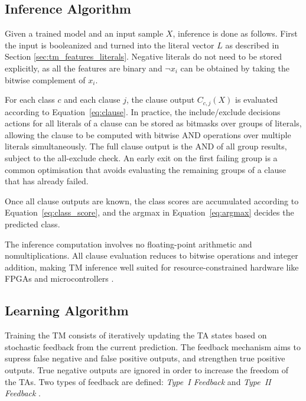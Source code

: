 \subsection{Inference Algorithm}
\label{sec:tm_inference}

Given a trained model and an input sample $X$, inference is done as follows.
First the input is booleanized and turned into the literal vector $L$ as
described in Section \ref{sec:tm_features_literals}. Negative literals do not need to be stored explicitly, as all the features are binary and $\lnot x_i$ can be obtained by taking the bitwise complement of $x_i$.

For each class $c$ and each clause $j$, the clause output $C_{c,j}(X)$ is
evaluated according to Equation~\eqref{eq:clause}. In practice, the
include/exclude decisions actions for all literals of a clause can be stored as bitmasks
over groups of literals, allowing the clause to be computed with bitwise AND operations over multiple literals simultaneously. The full clause output is the AND of all group results, subject to the all-exclude check. An early exit on the first failing group is a common optimisation that avoids evaluating the remaining groups of a clause that has already failed.

Once all clause outputs are known, the class scores are accumulated
according to Equation~\eqref{eq:class_score}, and the argmax in
Equation~\eqref{eq:argmax} decides the predicted class.

The inference computation involves no floating-point arithmetic and nomultiplications. All clause evaluation reduces to bitwise operations and integer addition, making TM inference well suited for resource-constrained hardware like FPGAs and microcontrollers \cite{GranmoOle-Christoffer2018TTM-}.


\subsection{Learning Algorithm}
\label{sec:tm_learning}

Training the TM consists of iteratively updating the TA states based on
stochastic feedback from the current prediction. The feedback mechanism aims to supress false negative and false positive outputs, and strengthen true positive outputs. True negative outputs are ignored in order to increase the freedom of the TAs. Two types of feedback
are defined: \textit{Type~I Feedback} and \textit{Type~II Feedback}
\cite{GranmoOle-Christoffer2018TTM-}.

